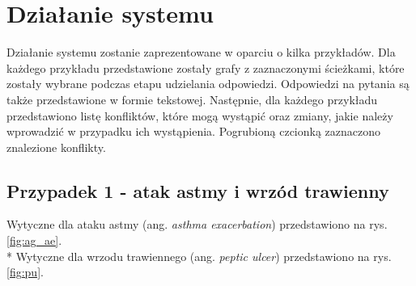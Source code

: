 \chapter{Działanie systemu}
Działanie systemu zostanie zaprezentowane w oparciu o kilka przykładów. Dla każdego przykładu przedstawione zostały grafy z zaznaczonymi ścieżkami, które zostały wybrane podczas etapu udzielania odpowiedzi. Odpowiedzi na pytania są także przedstawione w formie tekstowej. Następnie, dla każdego przykładu przedstawiono listę konfliktów, które mogą wystąpić oraz zmiany, jakie należy wprowadzić w przypadku ich wystąpienia. Pogrubioną czcionką zaznaczono znalezione konflikty.


\section{Przypadek 1 - atak astmy i wrzód trawienny}
Wytyczne dla ataku astmy (ang. \textit{asthma exacerbation}) przedstawiono na rys. \ref{fig:ag_ae}.\\*
Wytyczne dla wrzodu trawiennego (ang. \textit{peptic ulcer}) przedstawiono na rys. \ref{fig:pu}.


